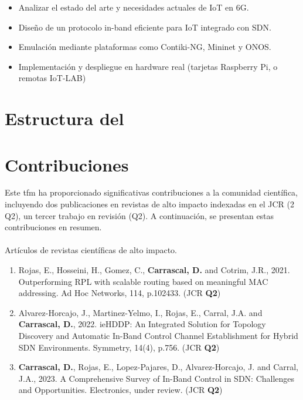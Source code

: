 \begin{itemize}
    \item Analizar el estado del arte y necesidades actuales de IoT en 6G.
    \item Diseño de un protocolo in-band eficiente para IoT integrado con SDN.
    \item Emulación mediante plataformas como Contiki-NG, Mininet y ONOS.
    \item Implementación y despliegue en hardware real (tarjetas Raspberry Pi, o remotas IoT-LAB)
\end{itemize}





\section{Estructura del }
\label{sec:structure}



\section{Contribuciones}
\label{sec:contributions}


Este \gls*{tfm} ha proporcionado significativas contribuciones a la comunidad científica, incluyendo dos publicaciones en revistas de alto impacto indexadas en el JCR (2 Q2), un tercer trabajo en revisión (Q2). A continuación, se presentan estas contribuciones en resumen.\\
\\
Artículos de revistas científicas de alto impacto.

\begin{enumerate}
    \item Rojas, E., Hosseini, H., Gomez, C., \textbf{Carrascal, D.} and Cotrim, J.R., 2021. Outperforming RPL with scalable routing based on meaningful MAC addressing. Ad Hoc Networks, 114, p.102433. (JCR \textbf{Q2})
    \item Alvarez-Horcajo, J., Martinez-Yelmo, I., Rojas, E., Carral, J.A. and \textbf{Carrascal, D.}, 2022. ieHDDP: An Integrated Solution for Topology Discovery and Automatic In-Band Control Channel Establishment for Hybrid SDN Environments. Symmetry, 14(4), p.756. (JCR \textbf{Q2})
    \item \textbf{Carrascal, D.}, Rojas, E., Lopez-Pajares, D., Alvarez-Horcajo, J. and Carral, J.A., 2023. A Comprehensive Survey of In-Band Control in SDN:
          Challenges and Opportunities. Electronics, under review. (JCR \textbf{Q2})
\end{enumerate}

